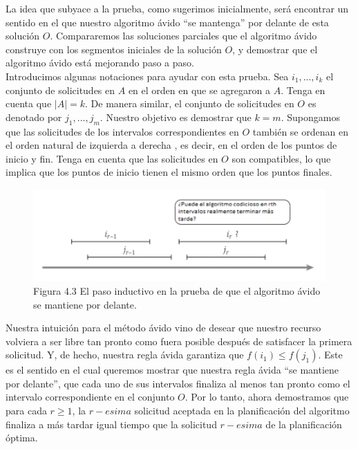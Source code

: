 \documentclass[a4paper, 12pt]{book}
\theoremstyle{dotless}
\begin{document}
La idea que subyace a la prueba, como sugerimos inicialmente, será encontrar un sentido en el que nuestro algoritmo ávido ``se mantenga'' por delante de esta solución $O$. Compararemos las soluciones parciales que el algoritmo ávido construye con los segmentos iniciales de la solución $O$, y demostrar que el algoritmo ávido está mejorando paso a paso.\\

Introducimos algunas notaciones para ayudar con esta prueba. Sea  $i_1, ...,i_k$ el conjunto de solicitudes en $A$ en el orden en que se agregaron a $A$. Tenga en cuenta que $|A| = k$. De manera similar, el conjunto de solicitudes en $O$ es denotado por $j_1, ...,j_m$. Nuestro objetivo es demostrar que $k = m$. Supongamos que las solicitudes de los intervalos correspondientes en $O$ también se ordenan en el orden natural de izquierda a derecha , es decir, en el orden de los puntos de inicio y fin. Tenga en cuenta que las solicitudes en $O$ son compatibles, lo que implica que los puntos de inicio tienen el mismo orden que los puntos finales.\\

\begin{figure}[h]
\centering
\includegraphics[scale=0.7]{Imagenes-Seccion4/fig4_3.PNG}
\caption{Figura 4.3 El paso inductivo en la prueba de que el algoritmo ávido se mantiene por delante.}
\end{figure}



Nuestra intuición para el método ávido vino de desear que nuestro recurso volviera a ser libre tan pronto como fuera posible después de satisfacer la primera solicitud. Y, de hecho, nuestra regla ávida garantiza que $f(i_1)≤ f(j_1)$. Este es el sentido en el cual queremos mostrar que nuestra regla ávida ``se mantiene por delante'', que cada uno de sus intervalos finaliza al menos tan pronto como el intervalo correspondiente en el conjunto $O$. Por lo tanto, ahora demostramos que para cada $r≥1$, la $r-esima$ solicitud aceptada en la planificación del algoritmo finaliza a más tardar igual tiempo que la solicitud $r-esima$ de la planificación óptima.\\
\end{document}

